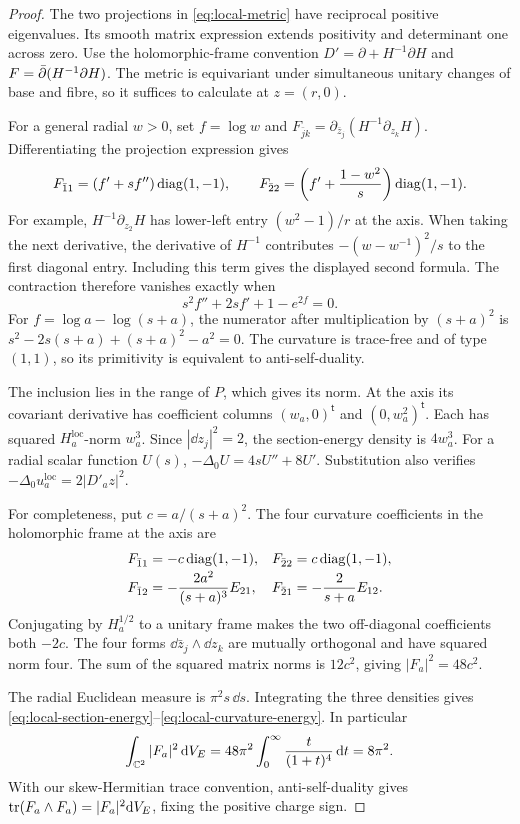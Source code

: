 \begin{proof}
The two projections in \eqref{eq:local-metric} have reciprocal
positive eigenvalues. Its smooth matrix expression extends
positivity and determinant one across zero.
Use the holomorphic-frame convention
$D'=\partial+H^{-1}\partial H$ and
$F=\bar\partial(H^{-1}\partial H)$.
The metric is equivariant under simultaneous unitary changes of
base and fibre, so it suffices to calculate at $z=(r,0)$.

For a general radial $w>0$, set $f=\log w$ and
$F_{\bar j k}=\partial_{\bar z_j}(H^{-1}\partial_{z_k}H)$.
Differentiating the projection expression gives
\[
 F_{\bar1 1}=(f'+sf'')\operatorname{diag}(1,-1),\qquad
 F_{\bar2 2}=\left(f'+\frac{1-w^2}{s}\right)\operatorname{diag}(1,-1).
\]
For example, $H^{-1}\partial_{z_2}H$ has lower-left entry
$(w^2-1)/r$ at the axis. When taking the next derivative,
the derivative of $H^{-1}$ contributes
$-(w-w^{-1})^2/s$ to the first diagonal entry. Including
this term gives the displayed second formula. The contraction
therefore vanishes exactly when
\[
                  s^2f''+2sf'+1-e^{2f}=0.
\]
For $f=\log a-\log(s+a)$, the numerator after multiplication
by $(s+a)^2$ is
$s^2-2s(s+a)+(s+a)^2-a^2=0$.
The curvature is trace-free and of type $(1,1)$, so its
primitivity is equivalent to anti-self-duality.

The inclusion lies in the range of $P$, which gives its norm.
At the axis its covariant derivative has coefficient columns
$(w_a,0)^{\mathsf t}$ and $(0,w_a^2)^{\mathsf t}$.
Each has squared $H_a^{\mathrm{loc}}$-norm $w_a^3$.
Since $|\dd z_j|^2=2$, the section-energy density is $4w_a^3$.
For a radial scalar function $U(s)$,
$-\Delta_0U=4sU''+8U'$. Substitution also verifies
$-\Delta_0u_a^{\mathrm{loc}}=2|D'_az|^2$.

For completeness, put $c=a/(s+a)^2$. The four curvature
coefficients in the holomorphic frame at the axis are
\[
 \begin{array}{ll}
 F_{\bar1 1}=-c\operatorname{diag}(1,-1),&
 F_{\bar2 2}= c\operatorname{diag}(1,-1),\\[2pt]
 F_{\bar1 2}=-\dfrac{2a^2}{(s+a)^3}E_{21},&
 F_{\bar2 1}=-\dfrac{2}{s+a}E_{12}.
 \end{array}
\]
Conjugating by $H_a^{1/2}$ to a unitary frame makes the
two off-diagonal coefficients both $-2c$. The four
forms $\dd\bar z_j\wedge\dd z_k$ are mutually orthogonal
and have squared norm four. The sum of the squared matrix
norms is $12c^2$, giving $|F_a|^2=48c^2$.

The radial Euclidean measure is $\pi^2s\,\dd s$.
Integrating the three densities gives
\eqref{eq:local-section-energy}--\eqref{eq:local-curvature-energy}.
In particular
\[
 \int_{\mathbb C^2}|F_a|^2\,\mathrm d V_E
       =48\pi^2\int_0^\infty\frac{t}{(1+t)^4}\,\mathrm d t
       =8\pi^2 .
\]
With our skew-Hermitian trace convention, anti-self-duality
gives $\operatorname{tr}(F_a\wedge F_a)=|F_a|^2\mathrm d V_E$, fixing the
positive charge sign.
\end{proof}

